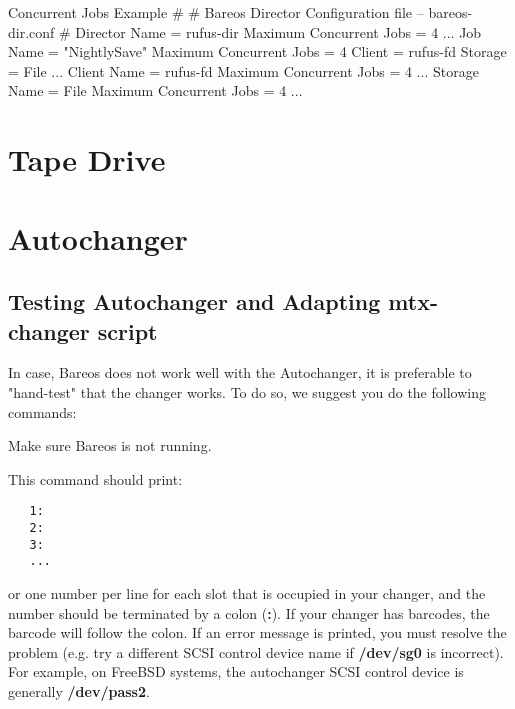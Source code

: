 \begin{bconfig}{Concurrent Jobs Example}
#
# Bareos Director Configuration file -- bareos-dir.conf
#
Director {
  Name = rufus-dir
  Maximum Concurrent Jobs = 4
  ...
}
Job {
  Name = "NightlySave"
  Maximum Concurrent Jobs = 4
  Client = rufus-fd
  Storage = File
  ...
}
Client {
  Name = rufus-fd
  Maximum Concurrent Jobs = 4
  ...
}
Storage {
  Name = File
  Maximum Concurrent Jobs = 4
  ...
}
\end{bconfig}




\section{Tape Drive}
\label{TapeTestingChapter}



\section{Autochanger}

\subsection{Testing Autochanger and Adapting mtx-changer script}
\label{AutochangerTesting}

In case, Bareos does not work well with the Autochanger,
it is preferable to
"hand-test" that the changer works. To do so, we suggest you do the
following commands:

Make sure Bareos is not running.


This command should print:

\footnotesize
\begin{verbatim}
   1:
   2:
   3:
   ...

\end{verbatim}
\normalsize

or one number per line for each slot that is  occupied in your changer, and
the number should be  terminated by a colon ({\bf :}). If your changer has
barcodes, the barcode will follow the colon.  If an error message is printed,
you must resolve the  problem (e.g. try a different SCSI control device name
if {\bf /dev/sg0}  is incorrect). For example, on FreeBSD systems, the
autochanger  SCSI control device is generally {\bf /dev/pass2}.

